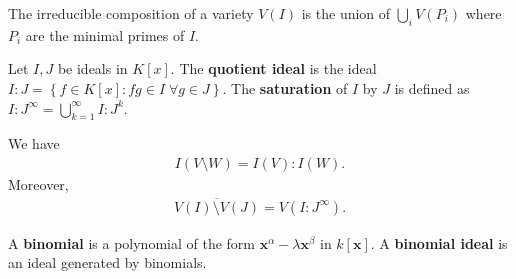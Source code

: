 \begin{prop}
  The irreducible composition of a variety \( V(I) \) is the union of \( \bigcup_{i} V(P_i) \) where \( P_i \) are the minimal primes of \( I \).
\end{prop}


\begin{defi}
  Let \( I,J \) be ideals in \( K[x] \). The \textbf{quotient ideal} is the ideal \(     I : J = \left\{ f \in K[x] : fg \in I\; \forall g \in J \right\} \). The \textbf{saturation} of \( I \) by \( J \) is defined as \(     I : J^\infty = \bigcup^\infty_{k=1} I : J^k
  \).
\end{defi}

\begin{prop}
  We have 
  \begin{align*}
    I(V \setminus W) = I(V) : I(W).
  \end{align*}
  Moreover,
  \begin{align*}
    \overline{V(I) \setminus V(J)} = V(I : J^\infty).
  \end{align*}
\end{prop}

\begin{defi}
  A \textbf{binomial} is a polynomial of the form \( \mathbf x^\alpha - \lambda \mathbf x^\beta \) in \( k[\mathbf x] \). A \textbf{binomial ideal} is an ideal generated by binomials.
\end{defi}